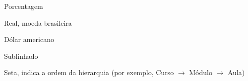\begin{simbolos}
    \item[\%] Porcentagem
    \item[R\$] Real, moeda brasileira
    \item[US\$] Dólar americano
    \item[\_] Sublinhado
    \item[$\rightarrow$] Seta, indica a ordem da hierarquia (por exemplo, Curso $\rightarrow$ Módulo $\rightarrow$ Aula)
\end{simbolos}